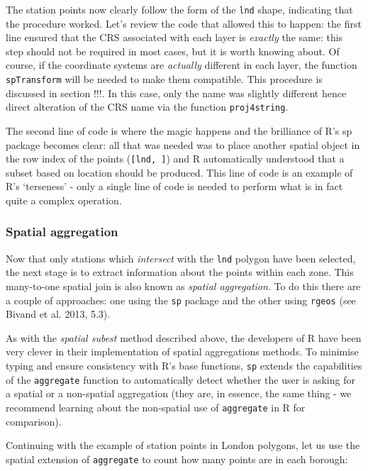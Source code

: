 \documentclass[]{article}
\begin{document}
The station points now clearly follow the form of the \texttt{lnd}
shape, indicating that the procedure worked. Let's review the code that
allowed this to happen: the first line ensured that the CRS associated
with each layer is \emph{exactly} the same: this step should not be
required in most cases, but it is worth knowing about. Of course, if the
coordinate systems are \emph{actually} different in each layer, the
function \texttt{spTransform} will be needed to make them compatible.
This procedure is discussed in section !!!. In this case, only the name
was slightly different hence direct alteration of the CRS name via the
function \texttt{proj4string}.

The second line of code is where the magic happens and the brilliance of
R's sp package becomes clear: all that was needed was to place another
spatial object in the row index of the points (\texttt{{[}lnd, {]}}) and
R automatically understood that a subset based on location should be
produced. This line of code is an example of R's `terseness' - only a
single line of code is needed to perform what is in fact quite a complex
operation.

\subsubsection{Spatial aggregation}

Now that only stations which \emph{intersect} with the \texttt{lnd}
polygon have been selected, the next stage is to extract information
about the points within each zone. This many-to-one spatial join is also
known as \emph{spatial aggregation}. To do this there are a couple of
approaches: one using the \texttt{sp} package and the other using
\texttt{rgeos} (see Bivand et al. 2013, 5.3).

As with the \emph{spatial subest} method described above, the developers
of R have been very clever in their implementation of spatial
aggregations methods. To minimise typing and ensure consistency with R's
base functions, \texttt{sp} extends the capabilities of the
\texttt{aggregate} function to automatically detect whether the user is
asking for a spatial or a non-spatial aggregation (they are, in essence,
the same thing - we recommend learning about the non-spatial use of
\texttt{aggregate} in R for comparison).

Continuing with the example of station points in London polygons, let us
use the spatial extension of \texttt{aggregate} to count how many points
are in each borough:
\end{document}
